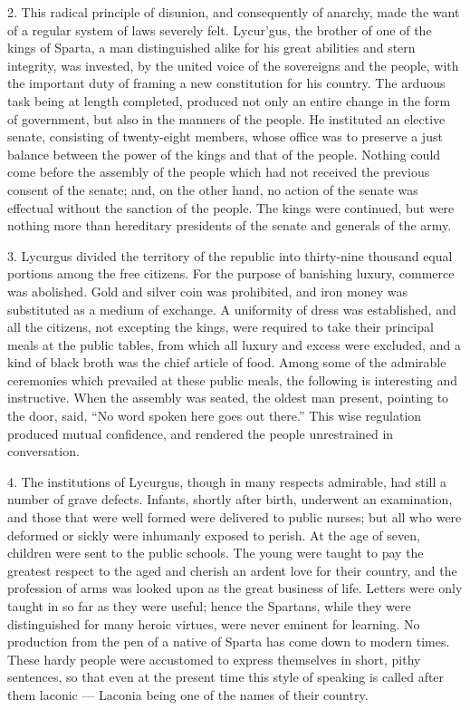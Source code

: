 \documentclass[openany,a4paper]{memoir}
\begin{document}
2. This radical principle of disunion, and consequently of 
anarchy, made the want of a regular system of laws severely 
felt. Lycur'gus, the brother of one of the kings of Sparta, 
a man distinguished alike for his great abilities and stern integrity, was invested, by the united voice of the sovereigns 
and the people, with the important duty of framing a new 
constitution for his country. The arduous task being at 
length completed, produced not only an entire change in the 
form of government, but also in the manners of the people. 
He instituted an elective senate, consisting of twenty-eight 
members, whose office was to preserve a just balance between 
the power of the kings and that of the people. Nothing 
could come before the assembly of the people which had not 
received the previous consent of the senate; and, on the other 
hand, no action of the senate was effectual without the sanction of the people. The kings were continued, but were 
nothing more than hereditary presidents of the senate and 
generals of the army. 

3. Lycurgus divided the territory of the republic into 
thirty-nine thousand equal portions among the free citizens. 
For the purpose of banishing luxury, commerce was abolished. Gold and silver coin was prohibited, and iron money 
was substituted as a medium of exchange. A uniformity of 
dress was established, and all the citizens, not excepting the 
kings, were required to take their principal meals at the public 
tables, from which all luxury and excess were excluded, and 
a kind of black broth was the chief article of food. Among 
some of the admirable ceremonies which prevailed at these 
public meals, the following is interesting and instructive. 
When the assembly was seated, the oldest man present, pointing to the door, said, ``No word spoken here goes out there.'' 
This wise regulation produced mutual confidence, and rendered the people unrestrained in conversation. 

4. The institutions of Lycurgus, though in many respects 
admirable, had still a number of grave defects. Infants, shortly 
after birth, underwent an examination, and those that were 
well formed were delivered to public nurses; but all who 
were deformed or sickly were inhumanly exposed to perish. 
At the age of seven, children were sent to the public schools. 
The young were taught to pay the greatest respect to the 
aged and cherish an ardent love for their country, and the 
profession of arms was looked upon as the great business of 
life. Letters were only taught in so far as they were useful; 
hence the Spartans, while they were distinguished for many 
heroic virtues, were never eminent for learning. No production from the pen of a native of Sparta has come down to 
modern times. These hardy people were accustomed to express themselves in short, pithy sentences, so that even at 
the present time this style of speaking is called after them 
laconic — Laconia being one of the names of their country. 
\end{document}

